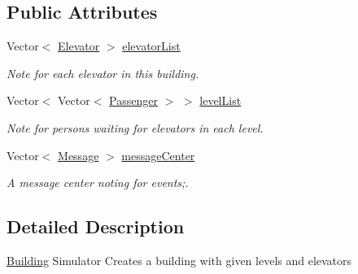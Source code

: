 \subsection*{Public Attributes}
\begin{DoxyCompactItemize}
\item 
\mbox{\label{classcn_1_1leonwong_1_1_elevator_simulator_1_1_model_1_1_building_a8317933aa9a1de07f64a8de984e19551}} 
Vector$<$ \hyperlink{classcn_1_1leonwong_1_1_elevator_simulator_1_1_model_1_1_elevator}{Elevator} $>$ \hyperlink{classcn_1_1leonwong_1_1_elevator_simulator_1_1_model_1_1_building_a8317933aa9a1de07f64a8de984e19551}{elevator\+List}
\begin{DoxyCompactList}\small\item\em Note for each elevator in this building. \end{DoxyCompactList}\item 
\mbox{\label{classcn_1_1leonwong_1_1_elevator_simulator_1_1_model_1_1_building_ae720233ad2086c6f427facb19df4fb33}} 
Vector$<$ Vector$<$ \hyperlink{classcn_1_1leonwong_1_1_elevator_simulator_1_1_model_1_1_passenger}{Passenger} $>$ $>$ \hyperlink{classcn_1_1leonwong_1_1_elevator_simulator_1_1_model_1_1_building_ae720233ad2086c6f427facb19df4fb33}{level\+List}
\begin{DoxyCompactList}\small\item\em Note for persons waiting for elevators in each level. \end{DoxyCompactList}\item 
\mbox{\label{classcn_1_1leonwong_1_1_elevator_simulator_1_1_model_1_1_building_a01f6bba8a7c8f2a26a34f7ee8c055275}} 
Vector$<$ \hyperlink{classcn_1_1leonwong_1_1_elevator_simulator_1_1_model_1_1_message}{Message} $>$ \hyperlink{classcn_1_1leonwong_1_1_elevator_simulator_1_1_model_1_1_building_a01f6bba8a7c8f2a26a34f7ee8c055275}{message\+Center}
\begin{DoxyCompactList}\small\item\em A message center noting for events;. \end{DoxyCompactList}\end{DoxyCompactItemize}


\subsection{Detailed Description}
\hyperlink{classcn_1_1leonwong_1_1_elevator_simulator_1_1_model_1_1_building}{Building} Simulator Creates a building with given levels and elevators 


